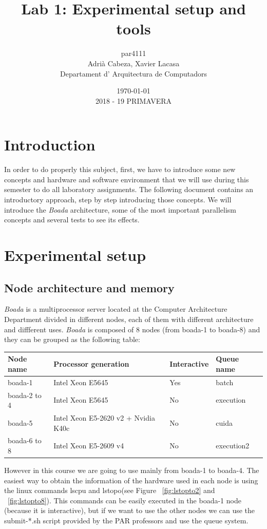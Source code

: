\documentclass[12]{article}
\author{par4111 \\ Adrià Cabeza, Xavier Lacasa \\ Departament d' Arquitectura de Computadors}
\title{Lab 1: Experimental setup and tools}
\date{\today \\ 2018 - 19 PRIMAVERA}
\begin{document}
\maketitle
\newpage
\tableofcontents
\newpage
\section{Introduction}
In order to do properly this subject, first, we have to introduce some new concepts and hardware and software environment that we will use during this semester to do all laboratory assignments.  The following document contains an introductory approach, step by step introducing those concepts. We will introduce the \textit{Boada} architecture, some of the most important parallelism concepts and several tests to see its effects. 

\section{Experimental setup}
\subsection{Node architecture and memory}

\textit{Boada} is a multiprocessor server located at the Computer Architecture Department divided in different nodes, each of them with different architecture and diffferent uses. \textit{Boada} is composed of 8 nodes (from boada-1 to boada-8) and they can be grouped as the following table: 
\\
\begin{table}[h]
\begin{tabular}{|l|l|l|l|}
\hline
Node name    & Processor generation                & Interactive & Queue name \\ \hline
boada-1      & Intel Xeon E5645                    & Yes         & batch      \\
boada-2 to 4 & Intel Xeon E5645                    & No          & execution  \\
boada-5      & Intel Xeon E5-2620 v2 + Nvidia K40c & No          & cuida      \\
boada-6 to 8 & Intel Xeon E5-2609 v4               & No          & execution2 \\ \hline
\end{tabular}
\end{table}

However in this course we are going to use mainly from boada-1 to boada-4. The easiest way to obtain the information of the hardware used in each node is using the linux commands lscpu and lstopo(see Figure  ~\ref{fig:lstopto2} and ~\ref{fig:lstopto8}). This commands can be easily executed in the boada-1 node (because it is interactive), but if we want to use the other nodes we can use the submit-*.sh script provided by the PAR professors and use the queue system. \\
\medskip
\end{document}
